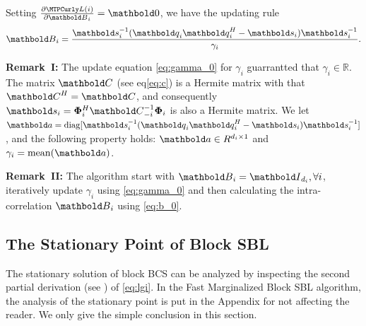 Setting $\frac{\partial \mathcal{L}(i)}{\partial \ve{B}_i}=\ve{0}$, we have the updating rule
\begin{equation}\label{eq:b_0}
\ve{B}_i = \frac{\ve{s}_i^{-1}(\ve{q}_i\ve{q}_i^H - \ve{s}_i)\ve{s}_i^{-1}}
{\gamma_i}.
\end{equation}


{\bf Remark~I:} The update equation \eqref{eq:gamma_0} for $\gamma_i$ guarrantted that $\gamma_i\in\mathbb{R}$. The matrix $\ve{C}$ (see eq\eqref{eq:c}) is a Hermite matrix with that $\ve{C}^H=\ve{C}$, and consequently $\ve{s}_i=\bm{\Phi}_i^H\ve{C}_{-i}^{-1}\bm{\Phi}_i$ is also a Hermite matrix. We let $\ve{a}=\mathrm{diag}[\ve{s}_i^{-1}(\ve{q}_i\ve{q}_i^H - \ve{s}_i)\ve{s}_i^{-1}]$, and the following property holds: $\ve{a}\in\mathbb{R}^{d_i\times1}$ and $\gamma_i=\mathrm{mean}(\ve{a})$.

{\bf Remark~II:} The algorithm start with $\ve{B}_i=\ve{I}_{d_i}, \forall i$, iteratively update $\gamma_i$ using \eqref{eq:gamma_0} and then calculating the intra-correlation $\ve{B}_i$ using \eqref{eq:b_0}.

\subsection{The Stationary Point of Block SBL}
The stationary solution of block BCS can be analyzed by inspecting the second partial 
derivation (see \cite{Faul2002,Tipping2003}) of \eqref{eq:lgi}. 
In the Fast Marginalized Block SBL algorithm, the analysis of the stationary point 
is put in the Appendix %
for not affecting the reader. We only give the 
simple conclusion in this section.


